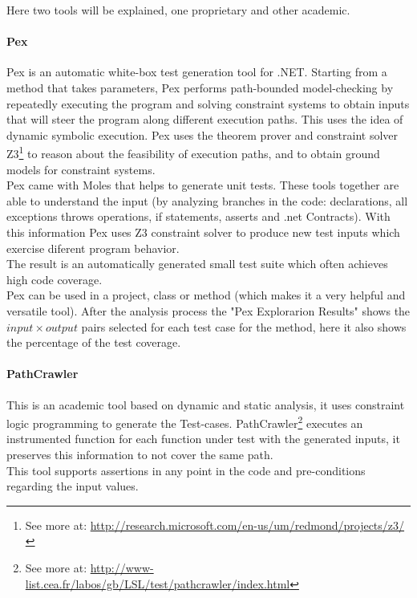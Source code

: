 Here two tools will be explained, one proprietary and other academic.

\paragraph{Pex} Pex\cite{Tillmann:2008:PWB:1792786.1792798} is an automatic white-box test generation tool for .NET. Starting from a
method that takes parameters, Pex performs path-bounded model-checking
by repeatedly executing the program and solving constraint systems to obtain inputs that will steer the program along different execution paths.
This uses the idea of dynamic symbolic execution\cite{Tillmann06unittests}. Pex uses the theorem prover and
constraint solver Z3\footnote{See more at: \url{http://research.microsoft.com/en-us/um/redmond/projects/z3/}} to reason about the feasibility of execution paths, and
to obtain ground models for constraint systems.\\
Pex came with Moles that helps to generate unit tests. These tools together are able to understand the input (by analyzing branches in the code:
declarations, all exceptions throws operations, if statements, asserts and .net Contracts). With this information Pex uses Z3 constraint solver to
produce new test inputs which exercise diferent program behavior.\\
The result is an automatically generated small test suite which often achieves high code coverage.\\
Pex can be used in a project, class or method (which makes it a very helpful and versatile tool). After the analysis process the "Pex Explorarion Results" shows
the $input \times output$ pairs selected for each test case for the method, here it also shows the percentage of the test coverage.

\paragraph{PathCrawler} This is an academic tool based on dynamic and static analysis\cite{Williams05pathcrawler:automatic}, 
it uses constraint logic programming to generate the Test-cases. PathCrawler\footnote{See more at: \url{http://www-list.cea.fr/labos/gb/LSL/test/pathcrawler/index.html}} executes an instrumented function for each function under test
with the generated inputs, it preserves this information to not cover the same path.\\
This tool supports assertions in any point in the code and pre-conditions regarding the input values.

